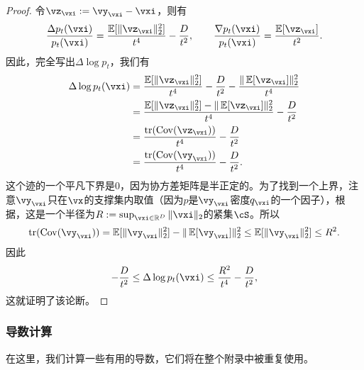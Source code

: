 \documentclass[../../book-main.tex]{subfiles}
\begin{document}
\begin{proof}
    令\(\vz_{\vxi} := \vy_{\vxi} - \vxi\)，则有
    \begin{equation}
        \frac{\Delta p_{t}(\vxi)}{p_{t}(\vxi)} = \frac{\Ex[\norm{\vz_{\vxi}}_{2}^{2}]}{t^{4}} - \frac{D}{t^{2}}, \qquad \frac{\nabla p_{t}(\vxi)}{p_{t}(\vxi)} = \frac{\Ex[\vz_{\vxi}]}{t^{2}}.
    \end{equation}
    因此，完全写出\(\Delta \log p_{t}\)，我们有
    \begin{align}
        \Delta \log p_{t}(\vxi)
        &= \frac{\Ex[\norm{\vz_{\vxi}}_{2}^{2}]}{t^{4}} - \frac{D}{t^{2}} - \frac{\norm{\Ex[\vz_{\vxi}]}_{2}^{2}}{t^{4}} \\
        &= \frac{\Ex[\norm{\vz_{\vxi}}_{2}^{2}] - \norm{\Ex[\vz_{\vxi}]}_{2}^{2}}{t^{4}} - \frac{D}{t^{2}} \\
        &= \frac{\tr(\Cov(\vz_{\vxi}))}{t^{4}} - \frac{D}{t^{2}} \\
        &= \frac{\tr(\Cov(\vy_{\vxi}))}{t^{4}} - \frac{D}{t^{2}}.
    \end{align}
    这个迹的一个平凡下界是\(0\)，因为协方差矩阵是半正定的。为了找到一个上界，注意\(\vy_{\vxi}\)只在\(\vx\)的支撑集内取值（因为\(p\)是\(\vy_{\vxi}\)密度\(q_{\vxi}\)的一个因子），根据，这是一个半径为\(R := \sup_{\vxi \in \R^{D}}\norm{\vxi}_{2}\)的紧集\(\cS\)。所以
    \begin{equation}
        \tr(\Cov(\vy_{\vxi})) = \Ex[\norm{\vy_{\vxi}}_{2}^{2}] - \norm{\Ex[\vy_{\vxi}]}_{2}^{2} \leq \Ex[\norm{\vy_{\vxi}}_{2}^{2}] \leq R^{2}.
    \end{equation}
    因此
    \begin{equation}
        -\frac{D}{t^{2}} \leq \Delta \log p_{t}(\vxi) \leq \frac{R^{2}}{t^{4}} - \frac{D}{t^{2}},
    \end{equation}
    这就证明了该论断。
\end{proof}

\subsubsection{导数计算}

在这里，我们计算一些有用的导数，它们将在整个附录中被重复使用。
\end{document}
